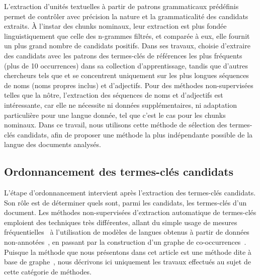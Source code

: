 
    L'extraction d'unités textuelles à partir de patrons grammaticaux prédéfinis
    permet de contrôler avec précision la nature et la grammaticalité des
    candidats extraits. À l'instar des chunks nominaux, leur extraction est plus
    fondée linguistiquement que celle des n-grammes filtrés, et comparée à eux,
    elle fournit un plus grand nombre de candidats positifs. Dans ses travaux,
     choisie d'extraire des candidats avec
    les patrons des termes-clés de références les plus fréquents (plus de 10
    occurrences) dans sa collection d'apprentissage, tandis que d'autres
    chercheurs tels que  et
     se concentrent uniquement sur les plus
    longues séquences de noms (noms propres inclus) et d'adjectifs. Pour des
    méthodes non-supervisées telles que la nôtre, l'extraction des séquences de 
    noms et d'adjectifs est intéressante, car elle ne nécessite ni données
    supplémentaires, ni adaptation particulière pour une langue donnée, tel que
    c'est le cas pour les chunks nominaux. Dans ce travail, nous utilisons cette
    méthode de sélection des termes-clés candidats, afin de proposer une méthode
    la plus indépendante possible de la langue des documents analysés.


  \subsection{Ordonnancement des termes-clés candidats}
  \label{subsec:ordonnancement_des_termes_cles_candidats}
    L'étape d'ordonnancement intervient après l'extraction des termes-clés
    candidats. Son rôle est de déterminer quels sont, parmi les candidats, les
    termes-clés d'un document.
    Les méthodes non-supervisées d'extraction automatique de termes-clés
    emploient des techniques très différentes, allant du simple usage de mesures
    fréquentielles~\cite{paukkeri2010likey} à l'utilisation de modèles de
    langues obtenus à partir de données
    non-annotées~\cite{tomokiyo2003languagemodel}, en passant par la
    construction d'un graphe de co-occurrences~\cite{mihalcea2004textrank}.
    Puisque la méthode que nous présentons dans cet article est une méthode dite
    \og à base de graphe~\fg, nous décrivons ici uniquement les travaux
    effectués au sujet de cette catégorie de méthodes.

